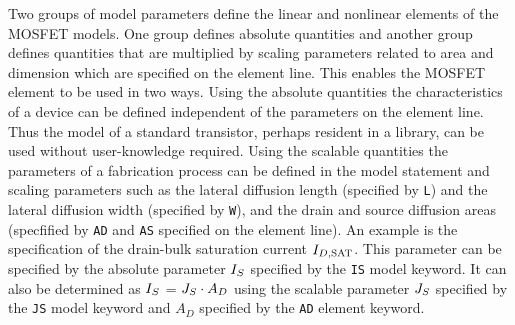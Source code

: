
%
%


Two groups of model parameters define the linear and nonlinear elements of the
MOSFET models. One group defines
absolute quantities and another group defines quantities that are multiplied
by scaling parameters related to area and dimension which are specified on the
element line.
This enables the MOSFET element to be used in two ways.  Using the absolute
quantities the characteristics of a device can be defined independent of the
parameters on the element line. Thus the model of a standard transistor,
perhaps resident in a library, can be used without user-knowledge required.
Using the scalable quantities the parameters of a fabrication process
can be defined in the model statement and scaling parameters such as the
lateral diffusion length (specified by {\tt L}) and
the lateral diffusion width (specified by {\tt W}), and
the drain and source diffusion areas (specfified by {\tt AD} and {\tt AS}
specified on the element line). 
An example is the specification of the drain-bulk saturation current
$I_{D,\mbox{\scriptsize SAT}}$.  This parameter can be specified by the absolute parameter
$I_S$ specified by the {\tt IS} model keyword.  It can also be determined
as $I_S$ = $J_S\cdot A_D$
using the scalable parameter $J_S$ specified by the {\tt JS} model keyword
and $A_D$ specified by the {\tt AD} element keyword.


